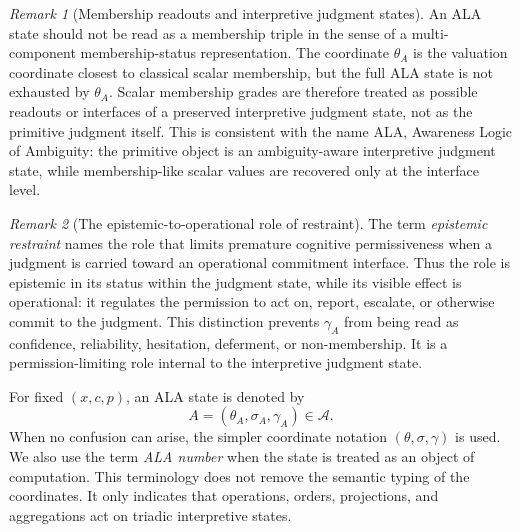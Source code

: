 \documentclass[reqno,final]{amsart}
\theoremstyle{definition}
\theoremstyle{plain}
\theoremstyle{remark}
\newtheorem{remark}{Remark}
\providecommand{\cA}{\mathcal{A}}
\begin{document}
\begin{remark}[Membership readouts and interpretive judgment states]
\label{rem:membership-readout-judgment-state}
An ALA state should not be read as a membership triple in the sense of a
multi-component membership-status representation. The coordinate
\(\theta_A\) is the valuation coordinate closest to classical scalar
membership, but the full ALA state is not exhausted by \(\theta_A\). Scalar
membership grades are therefore treated as possible readouts or interfaces
of a preserved interpretive judgment state, not as the primitive judgment
itself. This is consistent with the name ALA, Awareness Logic of Ambiguity:
the primitive object is an ambiguity-aware interpretive judgment state, while
membership-like scalar values are recovered only at the interface level.
\end{remark}

\begin{remark}[The epistemic-to-operational role of restraint]
\label{rem:epistemic-operational-restraint}
The term \emph{epistemic restraint} names the role that limits premature
cognitive permissiveness when a judgment is carried toward an operational
commitment interface. Thus the role is epistemic in its status within the
judgment state, while its visible effect is operational: it regulates the
permission to act on, report, escalate, or otherwise commit to the judgment.
This distinction prevents \(\gamma_A\) from being read as confidence,
reliability, hesitation, deferment, or non-membership. It is a
permission-limiting role internal to the interpretive judgment state.
\end{remark}

For fixed \((x,c,p)\), an ALA state is denoted by
\begin{equation}
\label{eq:ala-state}
A=(\theta_A,\sigma_A,\gamma_A)\in\cA.
\end{equation}
When no confusion can arise, the simpler coordinate notation \((\theta,\sigma,\gamma)\) is used. We also use the term \emph{ALA number} when the state is treated as an object of computation. This terminology does not remove the semantic typing of the coordinates. It only indicates that operations, orders, projections, and aggregations act on triadic interpretive states.
\end{document}
